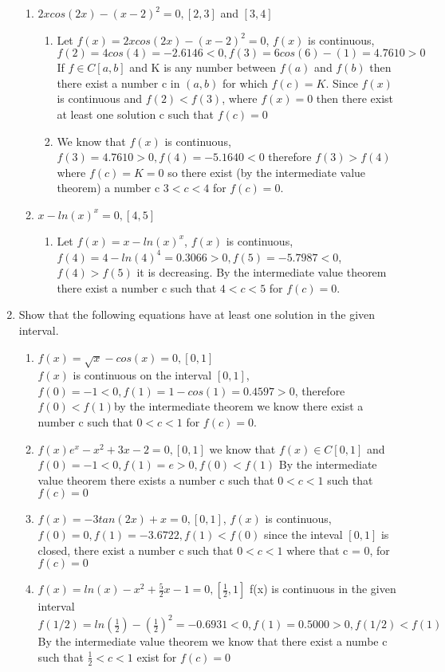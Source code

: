 \documentclass{article}
\begin{document}
\begin{enumerate}
\begin{enumerate}
        \item $2xcos(2x)-(x-2)^2=0, [2,3]$ and $[3,4]$
        \begin{enumerate}
            \item Let $f(x) = 2xcos(2x)-(x-2)^2=0$, $f(x)$ is continuous, $f(2)= 4cos(4) = -2.6146 < 0, f(3) = 6cos(6)-(1) = 4.7610 > 0 $ If $f\in C[a,b]$ and K is any number between $f(a)$ and $f(b)$ then there exist a number c in $(a,b)$ for which $f(c) = K$. 
            Since $f(x)$ is continuous and $f(2) < f(3)$, where $f(x) = 0$ then there exist at least one solution c such that $f(c) = 0$
            \item We know that $f(x)$ is continuous, $f(3) =4.7610 > 0, f(4) = -5.1640 < 0 $ therefore $f(3) > f(4)$ where $f(c) = K = 0$ so there exist (by the intermediate value theorem) a number c $3 < c < 4$ for $f(c) = 0$.
        \end{enumerate}
        \item $x-ln(x)^x = 0, [4,5]$ 
        \begin{enumerate}
            \item Let $f(x) = x - ln(x)^x $, $f(x)$ is continuous,$f(4) = 4 - ln(4)^4 = 0.3066 > 0, f(5) = -5.7987 < 0 $, $f(4) > f(5)$ it is decreasing. By the intermediate value theorem there exist a number c such that $4 < c < 5$ for $f(c) = 0$.
        \end{enumerate}
    \end{enumerate}
    \item Show that the following equations have at least one solution in the given interval.
    \begin{enumerate}
        \item $f(x) = \sqrt{x}-cos(x) = 0, [0,1]$\\
        $f(x)$ is continuous on the interval $[0,1]$, $f(0)=-1 < 0, f(1) = 1 - cos(1) = 0.4597 > 0$, therefore $f(0) < f(1) $by the intermediate theorem we know there exist a number c such that $0 < c < 1$ for $f(c) = 0$.
        \item $f(x) e^{x} - x^2 + 3x - 2 = 0, [0,1]$ we know that $f(x) \in C[0,1]$  and $f(0) = -1 < 0, f(1) = e > 0, f(0) < f(1) $ By the intermediate value theorem there exists a number c such that $0 < c < 1$ such that $f(c) = 0$
        \item $f(x) = -3tan(2x)+x=0, [0,1]$, $f(x)$ is continuous, $f(0) = 0, f(1) = -3.6722, f(1) < f(0)$ since the inteval $[0,1]$ is closed, there exist a number c such that $0 < c < 1$ where that c = 0, for $f(c) = 0$
        \item $f(x) = ln(x) - x^2 + \frac{5}{2}x - 1 = 0, [\frac{1}{2},1]$ f(x) is continuous in the given interval $f(1/2) = ln(\frac{1}{2}) - (\frac{1}{2})^2 = -0.6931 < 0, f(1) =  0.5000 > 0, f(1/2) < f(1)$ By the intermediate value theorem we know that there exist a numbe c such that $\frac{1}{2} < c < 1$ exist for $f(c) = 0$

\end{enumerate}
\end{enumerate}
\end{document}
